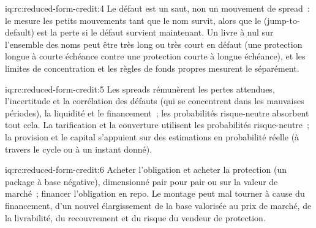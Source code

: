\begin{solution}{iq:rc:reduced-form-credit:4}
Le défaut est un saut, non un mouvement de spread~: le  mesure les petits mouvements tant que le nom survit,
alors que le  (jump-to-default) est la perte si le défaut survient maintenant. Un livre à  nul sur l'ensemble des noms
peut être très long ou très court en défaut (une protection longue à courte échéance contre une protection courte à longue échéance), et
les limites de concentration et les règles de fonds propres mesurent le  séparément.
\end{solution}

\begin{solution}{iq:rc:reduced-form-credit:5}
Les spreads rémunèrent les pertes attendues, l'incertitude et la corrélation des défauts
(qui se concentrent dans les mauvaises périodes), la liquidité et le financement~; les probabilités risque-neutre
absorbent tout cela. La tarification et la couverture utilisent les probabilités risque-neutre~; la provision et le capital
s'appuient sur des estimations en probabilité réelle (à travers le cycle ou à un instant donné).
\end{solution}

\begin{solution}{iq:rc:reduced-form-credit:6}
Acheter l'obligation et acheter la protection (un package à base négative), dimensionné pair pour pair ou
sur la valeur de marché~; financer l'obligation en repo. Le montage peut mal tourner à cause du financement, d'un nouvel élargissement
de la base valorisée au prix de marché, de la livrabilité, du recouvrement et du risque du vendeur de protection.
\end{solution}

